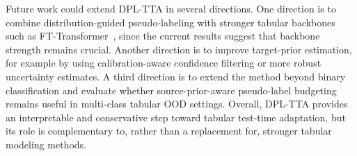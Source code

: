 \documentclass{article}
\begin{document}
Future work could extend DPL-TTA in several directions. One direction is to combine distribution-guided pseudo-labeling with stronger tabular backbones such as FT-Transformer~\citep{gorishniy2021revisiting}, since the current results suggest that backbone strength remains crucial. Another direction is to improve target-prior estimation, for example by using calibration-aware confidence filtering or more robust uncertainty estimates. A third direction is to extend the method beyond binary classification and evaluate whether source-prior-aware pseudo-label budgeting remains useful in multi-class tabular OOD settings. Overall, DPL-TTA provides an interpretable and conservative step toward tabular test-time adaptation, but its role is complementary to, rather than a replacement for, stronger tabular modeling methods.


\end{document}
